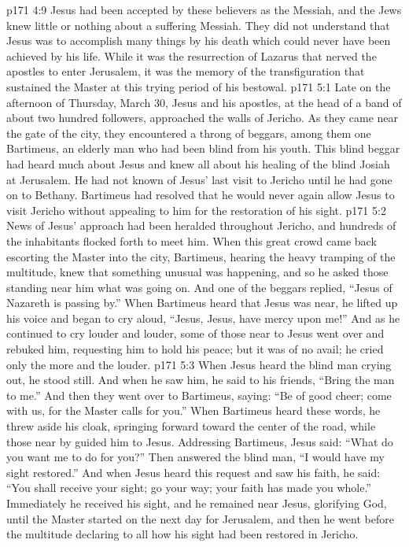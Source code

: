 \vs p171 4:9 Jesus had been accepted by these believers as the Messiah, and the Jews knew little or nothing about a suffering Messiah. They did not understand that Jesus was to accomplish many things by his death which could never have been achieved by his life. While it was the resurrection of Lazarus that nerved the apostles to enter Jerusalem, it was the memory of the transfiguration that sustained the Master at this trying period of his bestowal.
\vs p171 5:1 Late on the afternoon of Thursday, March 30, Jesus and his apostles, at the head of a band of about two hundred followers, approached the walls of Jericho. As they came near the gate of the city, they encountered a throng of beggars, among them one Bartimeus, an elderly man who had been blind from his youth. This blind beggar had heard much about Jesus and knew all about his healing of the blind Josiah at Jerusalem. He had not known of Jesus’ last visit to Jericho until he had gone on to Bethany. Bartimeus had resolved that he would never again allow Jesus to visit Jericho without appealing to him for the restoration of his sight.
\vs p171 5:2 News of Jesus’ approach had been heralded throughout Jericho, and hundreds of the inhabitants flocked forth to meet him. When this great crowd came back escorting the Master into the city, Bartimeus, hearing the heavy tramping of the multitude, knew that something unusual was happening, and so he asked those standing near him what was going on. And one of the beggars replied, “Jesus of Nazareth is passing by.” When Bartimeus heard that Jesus was near, he lifted up his voice and began to cry aloud, “Jesus, Jesus, have mercy upon me!” And as he continued to cry louder and louder, some of those near to Jesus went over and rebuked him, requesting him to hold his peace; but it was of no avail; he cried only the more and the louder.\plusone
\vs p171 5:3 When Jesus heard the blind man crying out, he stood still. And when he saw him, he said to his friends, \textcolor{ubdarkred}{“Bring the man to me.”} And then they went over to Bartimeus, saying: “Be of good cheer; come with us, for the Master calls for you.” When Bartimeus heard these words, he threw aside his cloak, springing forward toward the center of the road, while those near by guided him to Jesus. Addressing Bartimeus, Jesus said: \textcolor{ubdarkred}{“What do you want me to do for you?”} Then answered the blind man, “I would have my sight restored.” And when Jesus heard this request and saw his faith, he said: \textcolor{ubdarkred}{“You shall receive your sight; go your way; your faith has made you whole.”} Immediately he received his sight, and he remained near Jesus, glorifying God, until the Master started on the next day for Jerusalem, and then he went before the multitude declaring to all how his sight had been restored in Jericho.
